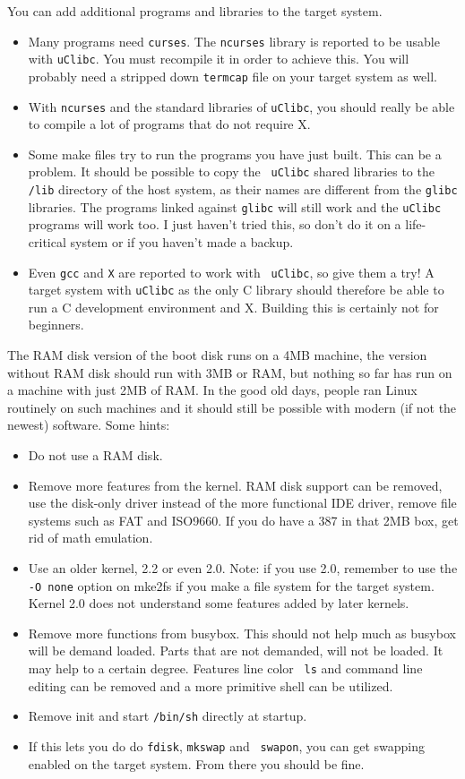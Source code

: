 \documentclass[12pt,a4paper]{article}
\begin{document}
You can add additional programs and libraries to the target system.
\begin{itemize}
\item Many programs need {\tt curses}. The {\tt ncurses} library is reported
  to be usable with {\tt uClibc}. You must recompile it in order to
  achieve this. You will probably need a stripped down {\tt termcap} file on
  your target system as well.
\item With {\tt ncurses} and the standard libraries of {\tt uClibc},
  you should really be able to compile a lot of programs that do not
  require X.
\item Some make files try to run the programs you have just
  built. This can be a problem. It should be possible to copy the {\tt
  uClibc} shared libraries to the {\tt /lib} directory of the host
  system, as their names are different from the {\tt glibc}
  libraries. The programs linked against {\tt glibc} will still work
  and the {\tt uClibc} programs will work too. I just haven't tried
  this, so don't do it on a life-critical system or if you haven't
  made a backup.
\item Even {\tt gcc} and {\tt X} are reported to work with {\tt
  uClibc}, so give them a try! A target system with {\tt uClibc} as
  the only C library should therefore be able to run a C development
  environment and X. Building this is certainly not for beginners.
\end{itemize}

The RAM disk version of the boot disk runs on a 4MB machine, the
version without RAM disk should run with 3MB or RAM, but nothing so
far has run on a machine with just 2MB of RAM. In the good old days,
people ran Linux routinely on such machines and it should still be
possible with modern (if not the newest) software. Some hints:
\begin{itemize}
\item Do not use a RAM disk.
\item Remove more features from the kernel. RAM disk support can be
  removed, use the disk-only driver instead of the more functional IDE
  driver, remove file systems such as FAT and ISO9660. If you do have
  a 387 in that 2MB box, get rid of math emulation.
\item Use an older kernel, 2.2 or even 2.0. Note: if you use 2.0,
  remember to use the {\tt -O none} option on mke2fs if you make a
  file system for the target system. Kernel 2.0 does not understand
  some features added by later kernels.
\item Remove more functions from busybox. This should not help much as
  busybox will be demand loaded. Parts that are not demanded, will not
  be loaded. It may help to a certain degree. Features line color {\tt
  ls} and command line editing can be removed and a more primitive
  shell can be utilized.
\item Remove init and start {\tt /bin/sh} directly at startup.
\item If this lets you do do {\tt fdisk}, {\tt mkswap} and {\tt
  swapon}, you can get swapping enabled on the target system. From
  there you should be fine.
\end{itemize}
\end{document}
